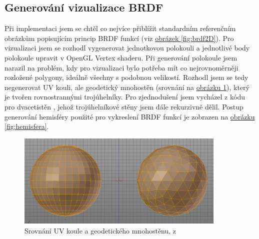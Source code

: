 \documentclass[czech,master,dept460,male,cpp,cpdeclaration]{diploma}
\begin{document}
\subsection{Generování vizualizace BRDF}
Při implementaci jsem se chtěl co nejvíce přiblížit standardním referenčním obrázkům popisujícím princip BRDF funkcí (viz \hyperref[fig:brdf2D]{obrázek \ref{fig:brdf2D}}). Pro vizualizaci jsem se rozhodl vygenerovat jednotkovou polokouli a jednotlivé body polokoule upravit v OpenGL Vertex shaderu. Při generování polokoule jsem narazil na problém, kdy pro vizualizaci bylo potřeba mít co nejrovnoměrněji rozložené polygony, ideálně všechny s podobnou velikostí. Rozhodl jsem se tedy negenerovat UV kouli, ale geodetický mnohostěn (srovnání na \hyperref[fig:spheresComparison]{obrázku \ref{fig:spheresComparison}}), který je tvořen rovnostrannými trojúhelníky. Pro zjednodušení jsem vycházel z kódu pro dvacetistěn \cite{OpenGLSphere}, jehož trojúhelníkové stěny jsem dále rekurzivně dělil. Postup generování hemisféry použité pro vykreslení BRDF funkcí je zobrazen na \hyperref[fig:hemisfera]{obrázku \ref{fig:hemisfera}}.

\begin{figure}[ht]
    \centering
    \includegraphics[width=10cm]{Figures/IcosphereUVSphereComparison.png}
    \caption{Srovnání UV koule a geodetického mnohostěnu, z \cite{tan_2019}}
    \label{fig:spheresComparison}
\end{figure}
\end{document}
